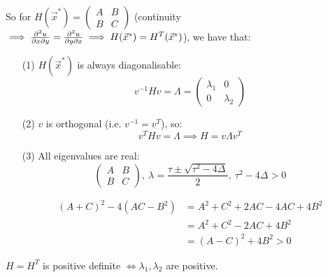 \documentclass[10pt]{scrartcl}
\begin{document}
So for $H(\vec{x}^*) = \begin{pmatrix}
 A & B \\ B & C	
 \end{pmatrix}
$ (continuity $\implies \frac{\partial^2u}{\partial x \partial y} = \frac{\partial^2u}{\partial y \partial x} \implies H(\vec{x}^*) = H^T(\vec{x}^*)$), we have that:
\begin{enumerate}
\item[(1)] $H(\vec{x}^*)$ is always diagonalisable: 
\[v^{-1}Hv = \Lambda = \begin{pmatrix}
 \lambda_1 & 0 \\ 0 & \lambda_2	
 \end{pmatrix}
\]

\item[(2)] $v$ is orthogonal (i.e. $v^{-1} = v^T$), so: 
\[v^THv = \Lambda \implies H = v \Lambda v^T\]

\item[(3)] All eigenvalues are real:
\[\begin{pmatrix}
A & B \\ B & C	
\end{pmatrix},~
\lambda = \frac{\tau \pm \sqrt{\tau^2 - 4\Delta}}{2}
,~\tau^2-4\Delta > 0\]

\[\begin{aligned}
(A+C)^2 - 4(AC - B^2) &= A^2 + C^2 + 2AC - 4AC + 4B^2\\
&= A^2 + C^2 - 2AC + 4B^2\\
&= (A-C)^2 + 4B^2 > 0	
\end{aligned}
\]

\end{enumerate}


\begin{theorem}
$H = H^T$ is positive definite $\iff \lambda_1,\lambda_2$ are positive.	
\end{theorem}
\end{document}

